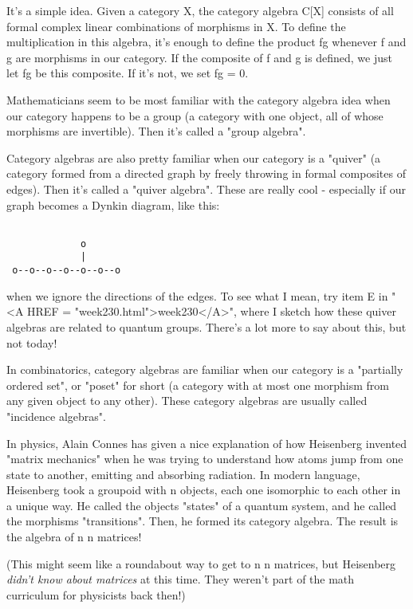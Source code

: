 It's a simple idea.  Given a category X, the category algebra C[X]
consists of all formal complex linear combinations of morphisms in X.
To define the multiplication in this algebra, it's enough to define
the product fg whenever f and g are morphisms in our category.  If 
the composite of f and g is defined, we just let fg be this composite.
If it's not, we set fg = 0.  

Mathematicians seem to be most familiar with the category algebra idea 
when our category happens to be a group (a category with one object, all 
of whose morphisms are invertible).  Then it's called a "group 
algebra".

Category algebras are also pretty familiar when our category is a
"quiver" (a category formed from a directed graph by freely
throwing in formal composites of edges).  Then it's called a
"quiver algebra".  These are really cool - especially if our
graph becomes a Dynkin diagram, like this:


\begin{verbatim}

             o
             |
 o--o--o--o--o--o--o
\end{verbatim}
    
when we ignore the directions of the edges.  To see what I mean, try 
item E in "<A HREF = "week230.html">week230</A>", where I sketch how these quiver algebras are 
related to quantum groups.  There's a lot more to say about this, but 
not today!

In combinatorics, category algebras are familiar when our category is
a "partially ordered set", or "poset" for short (a category with at
most one morphism from any given object to any other).  These category
algebras are usually called "incidence algebras".

In physics, Alain Connes has given a nice explanation of how
Heisenberg invented "matrix mechanics" when he was trying to
understand how atoms jump from one state to another, emitting and
absorbing radiation.  In modern language, Heisenberg took a groupoid
with n objects, each one isomorphic to each other in a unique way.  He
called the objects "states" of a quantum system, and he
called the morphisms "transitions".  Then, he formed its
category algebra.  The result is the algebra of n \times  n matrices!

(This might seem like a roundabout way to get to n \times  n matrices,
but Heisenberg \emph{didn't know about matrices} at this time.  They
weren't part of the math curriculum for physicists back then!)

